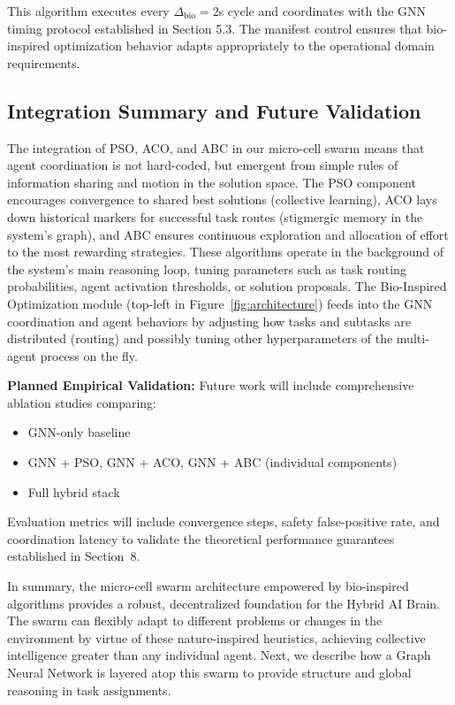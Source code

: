 \documentclass{article}
\begin{document}
This algorithm executes every $\Delta_{\text{bio}} = 2$s cycle and coordinates with the GNN timing protocol established in Section 5.3. The manifest control ensures that bio-inspired optimization behavior adapts appropriately to the operational domain requirements.

\subsection{Integration Summary and Future Validation}

The integration of PSO, ACO, and ABC in our micro-cell swarm means that agent coordination is not hard-coded, but emergent from simple rules of information sharing and motion in the solution space. The PSO component encourages convergence to shared best solutions (collective learning), ACO lays down historical markers for successful task routes (stigmergic memory in the system's graph), and ABC ensures continuous exploration and allocation of effort to the most rewarding strategies. These algorithms operate in the background of the system's main reasoning loop, tuning parameters such as task routing probabilities, agent activation thresholds, or solution proposals. The Bio-Inspired Optimization module (top-left in Figure~\ref{fig:architecture}) feeds into the GNN coordination and agent behaviors by adjusting how tasks and subtasks are distributed (routing) and possibly tuning other hyperparameters of the multi-agent process on the fly.

\textbf{Planned Empirical Validation:} Future work will include comprehensive ablation studies comparing:
\begin{itemize}
\item GNN-only baseline
\item GNN + PSO, GNN + ACO, GNN + ABC (individual components)  
\item Full hybrid stack
\end{itemize}
Evaluation metrics will include convergence steps, safety false-positive rate, and coordination latency to validate the theoretical performance guarantees established in Section~8.

In summary, the micro-cell swarm architecture empowered by bio-inspired algorithms provides a robust, decentralized foundation for the Hybrid AI Brain. The swarm can flexibly adapt to different problems or changes in the environment by virtue of these nature-inspired heuristics, achieving collective intelligence greater than any individual agent. Next, we describe how a Graph Neural Network is layered atop this swarm to provide structure and global reasoning in task assignments.
\end{document}
